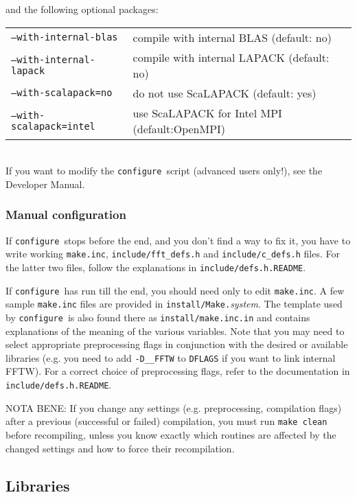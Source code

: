 \documentclass[12pt,a4paper]{article}
\def\configure{\texttt{configure}}
\begin{document}
and the following optional packages:\\
\begin{tabular}{ll}
\texttt{--with-internal-blas}&    compile with internal BLAS (default: no)\\
\texttt{--with-internal-lapack}&  compile with internal LAPACK (default: no)\\
\texttt{--with-scalapack=no}&     do not use ScaLAPACK (default: yes)\\
\texttt{--with-scalapack=intel}&  use ScaLAPACK for Intel MPI (default:OpenMPI)\\
\end{tabular}\\
If you want to modify the \configure\ script (advanced users only!),
see the Developer Manual.

\subsubsection{Manual configuration}
\label{SubSec:manconf}
If \configure\ stops before the end, and you don't find a way to fix
it, you have to write working \texttt{make.inc}, \texttt{include/fft\_defs.h}
and \texttt{include/c\_defs.h} files.
For the latter two files, follow the explanations in
\texttt{include/defs.h.README}.

If \configure\ has run till the end, you should need only to
edit \texttt{make.inc}. A few sample \texttt{make.inc} files
are provided in \texttt{install/Make.}{\em system}. The template used
by \configure\ is also found there as \texttt{install/make.inc.in}
and contains explanations of the meaning
of the various variables. Note that you may need
to select appropriate preprocessing flags
in conjunction with the desired or available
libraries (e.g. you need to add \texttt{-D\_\_FFTW} to \texttt{DFLAGS}
if you want to link internal FFTW). For a correct choice of preprocessing
flags, refer to the documentation in \texttt{include/defs.h.README}.

NOTA BENE: If you change any settings (e.g. preprocessing,
compilation flags)
after a previous (successful or failed) compilation, you must run
\texttt{make clean} before recompiling, unless you know exactly which
routines are affected by the changed settings and how to force their recompilation.

\subsection{Libraries}
\label{Sec:Libraries}
\end{document}
